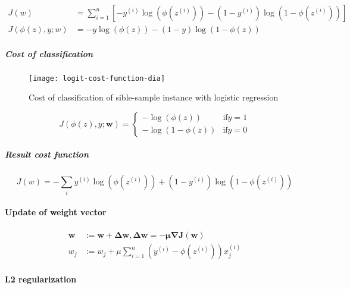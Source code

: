 \documentclass{article}
\begin{document}
			\begin{equation}
				\begin{aligned}
					J(w) &= \sum_{i=1}^n[-y^{(i)}\log(\phi(z^{(i)}))-(1-y^{(i)})\log(1-\phi(z^{(i)}))] \\
					J(\phi(z), y; w) &= - y \log(\phi(z))-(1-y)\log(1-\phi(z))			
				\end{aligned}
			\end{equation}
			
			\subparagraph{Cost of classification}
			
			\begin{figure}
				\centering
				\texttt{[image: logit-cost-function-dia]}
				\caption{Cost of classification of sible-sample instance with logistic regression}
				\label{fig:logit-cost-function-dia}
			\end{figure}
			
			\begin{equation}
				J(\phi(z), y; \boldsymbol{w}) = \begin{cases} -\log(\phi(z)) &\mbox{if} y=1 \\ -\log(1-\phi(z)) &\mbox{if} y=0 \end{cases}
			\end{equation}
			
			\subparagraph{Result cost function}
			
			\begin{equation}
				J(w) = - \sum_i y^{(i)} \log(\phi(z^{(i)})) + (1-y^{(i)}) \log(1-\phi(z^{(i)}))
			\end{equation}
			
			\paragraph{Update of weight vector}
			
			\begin{equation}
				\begin{aligned}
					\boldsymbol{w} & \boldsymbol{:= w + \Delta w, \Delta w = - \mu \nabla J(w)} \\
					w_j & := w_j + \mu \sum_{i=1}^n (y^{(i)} - \phi(z^{(i)}))x_j^{(i)}
				\end{aligned}
			\end{equation}
			
			\paragraph{L2 regularization}
			
\end{document}
